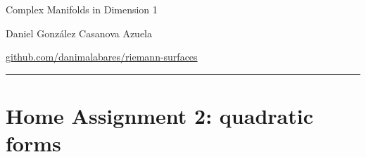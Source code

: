\documentclass{article}
\numberwithin{equation}{section}
\begin{document}
	\begin{minipage}{\textwidth}
		\begin{minipage}{.5\textwidth}
			Complex Manifolds in Dimension 1
		\end{minipage}%
		\begin{minipage}{.5\textwidth}
			\raggedleft
			Daniel González Casanova Azuela\par
			{\small\href{https://github.com/danimalabares/riemann-surfaces}{github.com/danimalabares/riemann-surfaces}}
		\end{minipage}%
	\end{minipage}\vspace{.2cm}\hrule
	\section{Home Assignment 2: quadratic forms}
\end{document}
